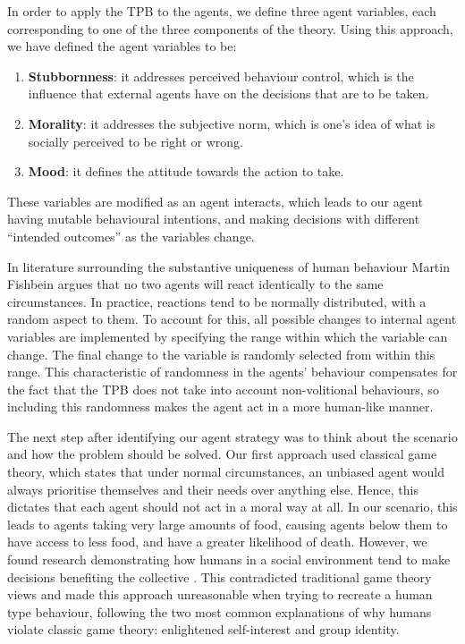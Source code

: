 In order to apply the TPB to the agents, we define three agent variables, each corresponding to one of the three components of the theory. Using this approach, we have defined the agent variables to be: 
\begin{enumerate}
    \item \textbf{Stubbornness}: it addresses perceived behaviour control, which is the influence that external agents have on the decisions that are to be taken.
    \item \textbf{Morality}: it addresses the subjective norm, which is one's idea of what is socially perceived to be right or wrong.
    \item \textbf{Mood}: it defines the attitude towards the action to take.
\end{enumerate}
These variables are modified as an agent interacts, which leads to our agent having mutable behavioural intentions, and making decisions with different “intended outcomes” as the variables change. \par
In literature surrounding the substantive uniqueness of human behaviour \cite{TRA} Martin Fishbein argues that no two agents will react identically to the same circumstances. In practice, reactions tend to be normally distributed, with a random aspect to them. To account for this, all possible changes to internal agent variables are implemented by specifying the range within which the variable can change. The final change to the variable is randomly selected from within this range. This characteristic of randomness in the agents’ behaviour compensates for the fact that the TPB does not take into account non-volitional behaviours, so including this randomness makes the agent act in a more human-like manner.\par 
The next step after identifying our agent strategy was to think about the scenario and how the problem should be solved. Our first approach used classical game theory, which states that under normal circumstances, an unbiased agent would always prioritise themselves and their needs over anything else. Hence, this dictates that each agent should not act in a moral way at all. In our scenario, this leads to agents taking very large amounts of food, causing agents below them to have access to less food, and have a greater likelihood of death. However, we found research demonstrating how humans in a social environment tend to make decisions benefiting the collective \cite{batson_batson_todd_brummett_shaw_aldeguer_1995}. This contradicted traditional game theory views and made this approach unreasonable when trying to recreate a human type behaviour, following the two most common explanations of why humans violate classic game theory: enlightened self-interest and group identity.\par 
